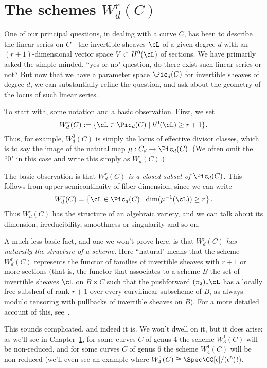 \section{The schemes $W^r_d(C)$}

One of our principal questions, in dealing with a curve $C$, has been to describe the linear series on $C$---the invertible sheaves $\cL$ of a given degree $d$ with an $(r+1)$-dimensional  vector space $V \subset H^0(\cL)$ of sections. We have primarily asked the simple-minded, ``yes-or-no" question, do there exist such linear series or not? But now that we have a parameter space $\Pic_d(C)$ for invertible sheaves of degree $d$, we can substantially refine the question, and ask about the geometry of the locus of such linear series.

To start with, some notation and a basic observation. First, we set
$$
W^r_d(C) := \{ \cL \in \Pic_d(C) \mid h^0(\cL) \geq r+1 \}.
$$
Thus, for example, $W^0_d(C)$ is simply the locus of effective divisor classes, which is to say the image of the natural map $\mu : C_d \to \Pic_d(C)$. (We often omit the ``0" in this case and write this simply as $W_d(C)$.)

The basic observation is that \emph{$W^r_d(C)$ is a closed subset of $\Pic_d(C)$}. This follows from upper-semicontinuity of fiber dimension, since we can write
$$
W^r_d(C) = \left\{ \cL \in \Pic_d(C) \mid \dim(\mu^{-1}(\cL)) \geq r \right\}.
$$
Thus $W^r_d(C)$ has the structure of an algebraic variety, and we can talk about its dimension, irreducibility, smoothness or singularity and so on.

A much less basic fact, and one we won't prove here, is that \emph{$W^r_d(C)$ has naturally the structure of a scheme}. Here ``natural" means that the scheme $W^r_d(C)$ represents the functor of families of invertible sheaves with $r+1$ or more sections (that is, the functor that associates to a scheme $B$ the set of invertible sheaves $\cL$ on $B \times C$ such that the pushforward $(\pi_2)_*\cL$ has a locally free subsheaf of rank $r+1$ over every curvilinear subscheme of $B$, as always modulo tensoring with pullbacks of invertible sheaves on $B$). For a more detailed account of this, see~\cite{ACGH}.

This sounds complicated, and indeed it is. We won't  dwell on it, but it does arise: as we'll see in Chapter~\ref{}, for some curves $C$ of genus 4 the scheme $W^1_3(C)$ will be non-reduced, and for some curves $C$ of genus 6 the scheme $W^1_4(C)$ will be non-reduced (we'll even see an example where $W^1_4(C) \cong \Spec \CC[\epsilon]/(\epsilon^5)$!). 


